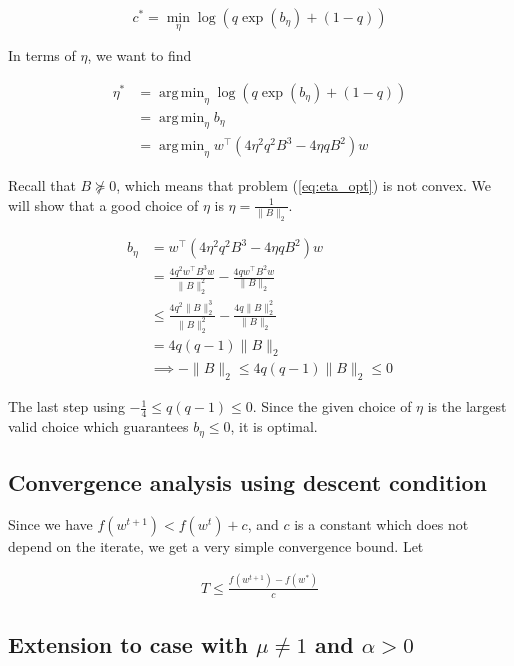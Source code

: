 \documentclass[11pt]{article}
\DeclareMathOperator*{\argmin}{arg\,min}
\begin{document}
\begin{equation}
    c^* = \min_{\eta} \log( q \exp(b_\eta ) + (1 - q))
\end{equation}

In terms of $\eta$, we want to find

\begin{equation}
\label{eq:eta_opt}
\begin{split}
    \eta^* &= \argmin_{\eta} \log( q \exp(b_\eta ) + (1 - q)) \\
    &= \argmin_{\eta} b_\eta \\
    &= \argmin_{\eta} w^{\top} ( 4 \eta^2 q^2 B^3 - 4 \eta q B^2)w
\end{split}
\end{equation}

Recall that $B \nsucceq 0$, which means that problem (\ref{eq:eta_opt}) is not convex. We will show that a good choice of $\eta$ is $\eta = \frac{1}{\|B\|_2}$.

\begin{align*}
    b_\eta &= w^{\top} ( 4 \eta^2 q^2 B^3 - 4 \eta q B^2)w \\
    &= \frac{4 q^2 w^{\top} B^3 w}{\|B\|_2^2} - \frac{4 q w^{\top} B^2 w}{\|B\|_2} \\
    &\leq \frac{4 q^2 \|B\|_2^3}{\|B\|_2^2} - \frac{4 q \|B\|_2^2 }{\|B\|_2} \\
    &= 4 q (q-1) \|B\|_2 \\
    &\implies -\|B\|_2 \leq 4 q (q-1) \|B\|_2 \leq 0
\end{align*}

The last step using $-\frac{1}{4} \leq q (q-1) \leq 0$. Since the given choice of $\eta$ is the largest valid choice which guarantees $b_\eta \leq 0$, it is optimal.

\subsection{Convergence analysis using descent condition}

Since we have $f(w^{t+1}) < f(w^t) + c$, and $c$ is a constant which does not depend on the iterate, we get a very simple convergence bound. Let

\begin{align*}
    T \leq \frac{f(w^{t+1}) - f(w^*)}{c}
\end{align*}

\subsection{Extension to case with $\mu \neq 1$ and $\alpha > 0$}
\end{document}
